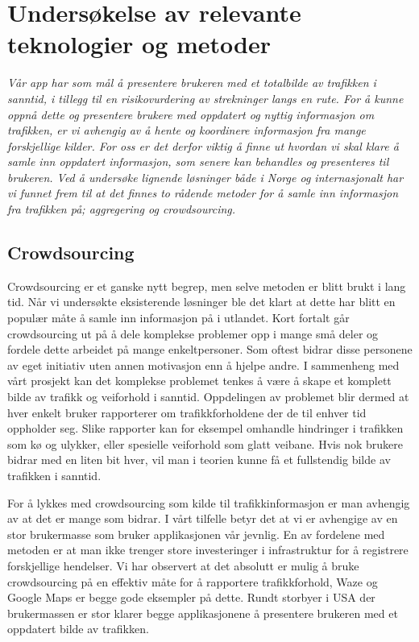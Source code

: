 \documentclass[a4paper,norsk,oneside]{book}
\begin{document}
\chapter{Undersøkelse av relevante teknologier og metoder}
\label{cha:ResearchAndResults}

{\it Vår app har som mål å presentere brukeren med et totalbilde av trafikken i sanntid, i tillegg til en risikovurdering av strekninger langs en rute. For å kunne oppnå dette og presentere brukere med oppdatert og nyttig informasjon om trafikken, er vi avhengig av å hente og koordinere informasjon fra mange forskjellige kilder. For oss er det derfor viktig å finne ut hvordan vi skal klare å samle inn oppdatert informasjon, som senere kan behandles og presenteres til brukeren. Ved å undersøke lignende løsninger både i Norge og internasjonalt har vi funnet frem til at det finnes to rådende metoder for å samle inn informasjon fra trafikken på; aggregering og crowdsourcing. }

\section{Crowdsourcing}
\label{sec:crowdsourcing}

Crowdsourcing er et ganske nytt begrep, men selve metoden er blitt brukt i lang tid. Når vi undersøkte eksisterende løsninger ble det klart at dette har blitt en populær måte å samle inn informasjon på i utlandet. Kort fortalt går crowdsourcing ut på å dele komplekse problemer opp i mange små deler og fordele dette arbeidet på mange enkeltpersoner. Som oftest bidrar disse personene av eget initiativ uten annen motivasjon enn å hjelpe andre. I sammenheng med vårt prosjekt kan det komplekse problemet tenkes å være å skape et komplett bilde av trafikk og veiforhold i sanntid. Oppdelingen av problemet blir dermed at hver enkelt bruker rapporterer om trafikkforholdene der de til enhver tid oppholder seg. Slike rapporter kan for eksempel omhandle hindringer i trafikken som kø og ulykker, eller spesielle veiforhold som glatt veibane. Hvis nok brukere bidrar med en liten bit hver, vil man i teorien kunne få et fullstendig bilde av trafikken i sanntid.

For å lykkes med crowdsourcing som kilde til trafikkinformasjon er man avhengig av at det er mange som bidrar. I vårt tilfelle betyr det at vi er avhengige av en stor brukermasse som bruker applikasjonen vår jevnlig. En av fordelene med metoden er at man ikke trenger store investeringer i infrastruktur for å registrere forskjellige hendelser. Vi har observert at det absolutt er mulig å bruke crowdsourcing på en effektiv måte for å rapportere trafikkforhold, Waze og Google Maps er begge gode eksempler på dette. Rundt storbyer i USA der brukermassen er stor klarer begge applikasjonene å presentere brukeren med et oppdatert bilde av trafikken.
\end{document}
